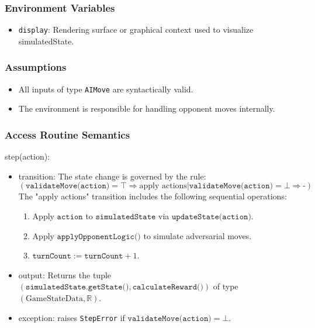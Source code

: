 \documentclass[12pt, titlepage]{article}
\begin{document}
\subsubsection{Environment Variables}
\begin{itemize}
\item \texttt{display}: Rendering surface or graphical context used to visualize simulatedState.
\end{itemize}

\subsubsection{Assumptions}
\begin{itemize}
    \item All inputs of type \texttt{AIMove} are syntactically valid.
    \item The environment is responsible for handling opponent moves internally.
\end{itemize}

\subsubsection{Access Routine Semantics}

\noindent step(action):
\begin{itemize}
\item transition:
The state change is governed by the rule:
\[
(
  \texttt{validateMove(action)} = \top \Rightarrow \text{apply actions}
|
  \texttt{validateMove(action)} = \bot \Rightarrow \text{-}
)
\]
\quad The "apply actions" transition includes the following sequential operations:
\begin{enumerate}
    \item Apply $\texttt{action}$ to $\texttt{simulatedState}$ via $\texttt{updateState(action)}$.
    \item Apply $\texttt{applyOpponentLogic()}$ to simulate adversarial moves.
    \item $\texttt{turnCount} := \texttt{turnCount} + 1$.
\end{enumerate}
\item output:  
      Returns the tuple $(\texttt{simulatedState.getState()}, \texttt{calculateReward()})$  
      of type $(\text{GameStateData}, \mathbb{R})$.
\item exception:  
      raises \texttt{StepError} if $\texttt{validateMove(action)} = \bot$.
\end{itemize}
\end{document}
